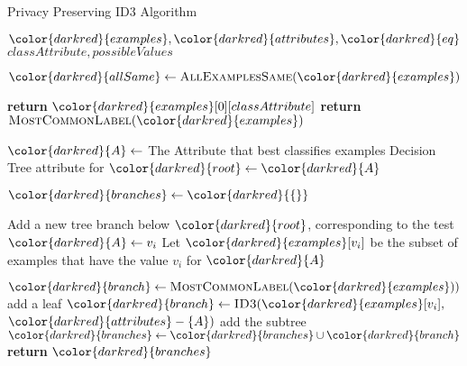 \begin{algorithm}[H]
\caption{Privacy Preserving ID3 Algorithm }\label{a:id3-pp}
\begin{algorithmic}[1]
\renewcommand{\algorithmicrequire}{\textbf{Private Vars:}}
\Require ${\color{darkred}{examples}}, {\color{darkred}{attributes}}, {\color{darkred}{eq}}$
\renewcommand{\algorithmicrequire}{\textbf{Global Vars:}}
\Require $classAttribute, possibleValues$

    \State ${\color{darkred}{allSame}} \gets \textsc{AllExamplesSame}({\color{darkred}{examples}})$
    
        \State \textbf{return} ${\color{darkred}{examples}}[0][classAttribute]$
        \State \textbf{return} $\textsc{MostCommonLabel}({\color{darkred}{examples}})$
    \EndIf
  
    \State ${\color{darkred}{A}} \gets$ The Attribute that best classifies examples
    \State Decision Tree attribute for ${\color{darkred}{root}} \gets {\color{darkred}{A}}$
    
    \State ${\color{darkred}{branches}} \gets {\color{darkred}{\{\}}}$

        \State Add a new tree branch below ${\color{darkred}{root}}$, corresponding to the test ${\color{darkred}{A}} \gets v_i$
        \State Let ${\color{darkred}{examples}}[v_i]$ be the subset of examples that have the value $v_i$ for ${\color{darkred}{A}}$

            \State ${\color{darkred}{branch}} \gets \textsc{MostCommonLabel}({\color{darkred}{examples}}))$ add a leaf
        \Else
            \State ${\color{darkred}{branch}} \gets \textsc{ID3}({\color{darkred}{examples}}[v_i],$ ${\color{darkred}{attributes}} - \{A\})$ add the subtree
        \EndIf
        \State ${\color{darkred}{branches}} \gets {\color{darkred}{branches}} \cup {\color{darkred}{branch}}$
    \EndFor
    \State \textbf{return} ${\color{darkred}{branches}}$
      
\EndProcedure

\end{algorithmic}
\end{algorithm}

